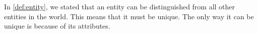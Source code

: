 %
%
%
In \cref{def:entity}, we stated that an entity can be distinguished from all other entities in the world.
This means that it must be unique.
The only way it can be unique is because of its attributes.%
%
%
%
%
\endhsection%
%
